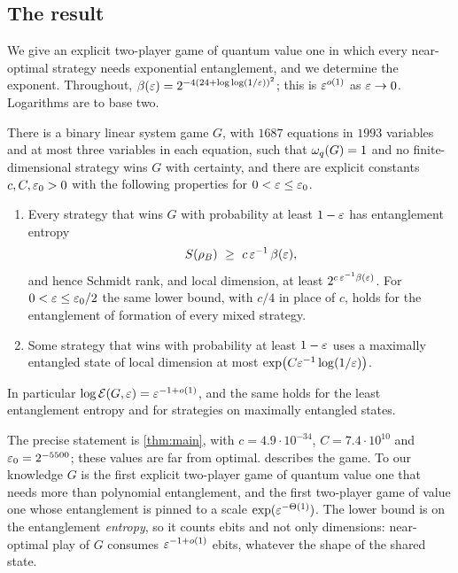 \subsection{The result}

We give an explicit two-player game of quantum value one in which every near-optimal strategy needs exponential entanglement, and we
determine the exponent. Throughout, $\beta(\varepsilon)=2^{-4(24+\log\log(1/\varepsilon))^2}$; this is $\varepsilon^{o(1)}$ as $\varepsilon\to0$. Logarithms are to
base two.

\begin{theoremA}
There is a binary linear system game $G$, with $1687$ equations in $1993$ variables and at most three variables in each equation, such that
$\omega_{q}(G)=1$ and no finite-dimensional strategy wins $G$ with certainty, and there are explicit constants $c,C,\varepsilon_0>0$ with the
following properties for $0<\varepsilon\le\varepsilon_0$.
\begin{enumerate}[label=(\roman*),itemsep=1pt]
\item Every strategy that wins $G$ with probability at least $1-\varepsilon$ has entanglement entropy
\[
S(\rho_B)\ \ge\ c\,\eps^{-1}\,\bfun(\eps),
\]
and hence Schmidt rank, and local dimension, at least $2^{c\,\varepsilon^{-1}\beta(\varepsilon)}$. For $0<\varepsilon\le\varepsilon_0/2$ the same lower bound,
with $c/4$ in place of $c$, holds for the entanglement of formation of every mixed strategy.
\item Some strategy that wins with probability at least $1-\varepsilon$ uses a maximally entangled state of local dimension at most
$\exp\bigl(C\varepsilon^{-1}\log(1/\varepsilon)\bigr)$.
\end{enumerate}
In particular $\log\mathcal E(G,\varepsilon)=\varepsilon^{-1+o(1)}$, and the same holds for the least entanglement entropy and for strategies on maximally
entangled states.
\end{theoremA}

The precise statement is \cref{thm:main}, with $c=4.9\cdot10^{-34}$, $C=7.4\cdot10^{10}$ and $\varepsilon_0=2^{-5500}$; these values are far
from optimal.  describes the game. To our knowledge $G$ is the first explicit two-player game
of quantum value one that needs more than polynomial entanglement, and the first two-player game of value one whose entanglement is pinned
to a scale $\exp(\varepsilon^{-\Theta(1)})$. The lower bound is on the entanglement \emph{entropy}, so it counts ebits and not only dimensions:
near-optimal play of $G$ consumes $\varepsilon^{-1+o(1)}$ ebits, whatever the shape of the shared state.

